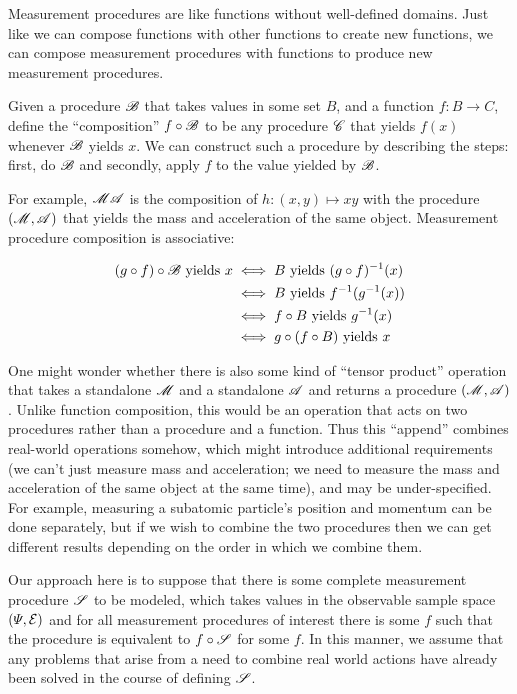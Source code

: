 Measurement procedures are like functions without well-defined domains. Just like we can compose functions with other functions to create new functions, we can compose measurement procedures with functions to produce new measurement procedures.

\begin{definition}
Given a procedure $\mathscr{B}$ that takes values in some set $B$, and a function $f:B\to C$, define the ``composition'' $f\circ \mathscr{B}$ to be any procedure $\mathscr{C}$ that yields $f(x)$ whenever $\mathscr{B}$ yields $x$. We can construct such a procedure by describing the steps: first, do $\mathscr{B}$ and secondly, apply $f$ to the value yielded by $\mathscr{B}$.
\end{definition}

For example, $\mathscr{MA}$ is the composition of $h:(x,y)\mapsto xy$ with the procedure $(\mathscr{M},\mathscr{A})$ that yields the mass and acceleration of the same object. Measurement procedure composition is associative:

\begin{align}
    (g\circ f)\circ\mathscr{B}\text{ yields } x &\iff B\text{ yields } (g\circ f)^{-1}(x) \\
    &\iff B\text{ yields } f^{-1}(g^{-1}(x))\\
    &\iff f\circ B \text{ yields } g^{-1}(x)\\
    &\iff g\circ(f\circ B)\text{ yields } x
\end{align}


One might wonder whether there is also some kind of ``tensor product'' operation that takes a standalone $\mathscr{M}$ and a standalone $\mathscr{A}$ and returns a procedure $(\mathscr{M},\mathscr{A})$. Unlike function composition, this would be an operation that acts on two procedures rather than a procedure and a function. Thus this ``append'' combines real-world operations somehow, which might introduce additional requirements (we can't just measure mass and acceleration; we need to measure the mass and acceleration of the same object at the same time), and may be under-specified. For example, measuring a subatomic particle's position and momentum can be done separately, but if we wish to combine the two procedures then we can get different results depending on the order in which we combine them.

Our approach here is to suppose that there is some complete measurement procedure $\mathscr{S}$ to be modeled, which takes values in the observable sample space $(\Psi,\mathcal{E})$ and for all measurement procedures of interest there is some $f$ such that the procedure is equivalent to $f\circ \mathscr{S}$ for some $f$. In this manner, we assume that any problems that arise from a need to combine real world actions have already been solved in the course of defining $\mathscr{S}$.

